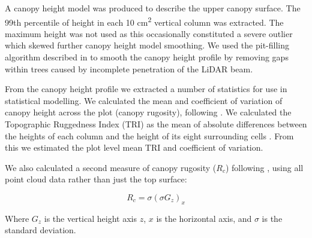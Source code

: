 \documentclass[11pt,a4paper]{article}
\begin{document}
A canopy height model was produced to describe the upper canopy surface. The 99th percentile of height in each 10 cm\textsuperscript{2} vertical column was extracted. The maximum height was not used as this occasionally constituted a severe outlier which skewed further 
canopy height model smoothing. We used the pit-filling algorithm described in \citet{Khosravipour2014} to smooth the canopy height profile by removing gaps within trees caused by incomplete penetration of the LiDAR beam.

From the canopy height profile we extracted a number of statistics for use in statistical modelling. We calculated the mean and coefficient of variation of canopy height across the plot (canopy rugosity), following \citep{Parker2004}. We calculated the Topographic Ruggedness Index (TRI) as the mean of absolute differences between the heights of each column and the height of its eight surrounding cells \citep{Wilson2007}. From this we estimated the plot level mean TRI and coefficient of variation. 

We also calculated a second measure of canopy rugosity ($R_{c}$) following \citet{Hardiman2011}, using all point cloud data rather than just the top surface:

\begin{equation}
	R_{c} = \sigma{}(\sigma{}G_{z})_{x}
\end{equation}

Where $G_{z}$ is the vertical height axis $z$, $x$ is the horizontal axis, and $\sigma{}$ is the standard deviation.

\printbibliography
\end{document}
